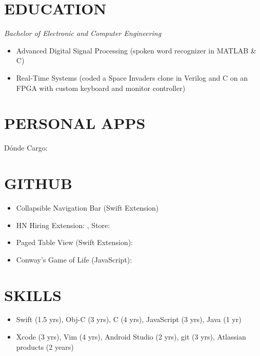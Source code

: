\documentclass[margin]{res}
\begin{document}
\begin{resume}
\section{EDUCATION} {\sl Bachelor of Electronic and Computer Engineering}
		\begin{itemize}
                \item Advanced Digital Signal Processing (spoken word recognizer 
                in MATLAB \& C)
                \item Real-Time Systems (coded a Space Invaders clone in Verilog
                 and C on an FPGA with custom keyboard and monitor controller)
                 \end{itemize}

\section{PERSONAL APPS}
		D\'onde Cargo: \\


\section{GITHUB}       
	\begin{itemize} 
	    \item Collapsible Navigation Bar (Swift Extension) 
	    \item HN Hiring Extension: , Store: 
	    \item Paged Table View (Swift Extension): 
	    \item Conway's Game of Life (JavaScript): 
	\end{itemize}
                
\section{SKILLS} 
	\begin{itemize}
	\item Swift (1.5 yrs), Obj-C (3 yrs), C (4 yrs), JavaScript (3 yrs), Java (1 yr)
	\item Xcode (3 yrs), Vim (4 yrs), Android Studio (2 yrs), git (3 yrs), Atlassian products (2 years) 
	\end{itemize}

\end{resume}
\end{document}
